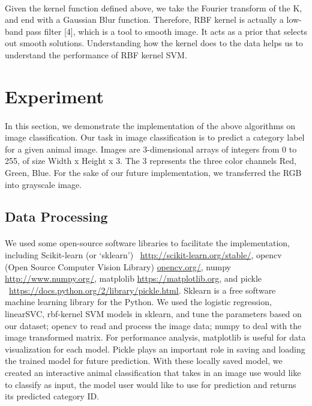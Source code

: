 \documentclass{article}
\begin{document}
\paragraph{}
Given the kernel function defined above, we take the Fourier transform of the K, and end with a Gaussian Blur function. Therefore, RBF kernel is actually a low-band pass filter [4], which is a tool to smooth image. It acts as a prior that selects out smooth solutions. Understanding how the kernel does to the data helps us to understand the performance of RBF kernel SVM. 


\section{Experiment}
\paragraph{}
In this section, we demonstrate the implementation of the above algorithms on image classification. Our task in image classification is to predict a category label for a given animal image. Images are 3-dimensional arrays of integers from 0 to 255, of size Width x Height x 3. The 3 represents the three color channels Red, Green, Blue. For the sake of our future implementation, we transferred the RGB into grayscale image.

\subsection{Data Processing}
\paragraph{}
We used some open-source software libraries to facilitate the implementation, including Scikit-learn (or ‘sklearn’) \ \url{http://scikit-learn.org/stable/}, opencv (Open Source Computer Vision Library) 
 \url{opencv.org/}, numpy \url{http://www.numpy.org/},  matplolib \url{https://matplotlib.org}, and pickle \ \url{https://docs.python.org/2/library/pickle.html}. Sklearn is a free software machine learning library for the Python. We used the logistic regression, linearSVC, rbf-kernel SVM models in sklearn, and tune the parameters based on our dataset; opencv to read and process the image data; numpy to deal with the image transformed matrix. For performance analysis, matplotlib is useful for data visualization for each model. Pickle plays an important role in saving and loading the trained model for future prediction. With these locally saved model, we created an interactive animal classification that takes in an image use would like to classify as input, the model user would like to use for prediction and returns its predicted category ID.
\end{document}
